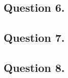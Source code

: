 \documentclass{mhk}
\begin{document}
\subsection*{Question 6.}






\subsection*{Question 7.}






\subsection*{Question 8.}





\end{document}
